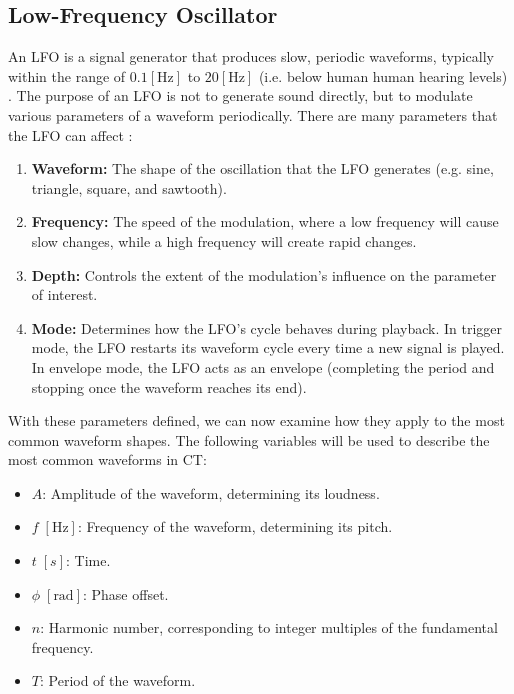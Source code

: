 \documentclass[12pt]{article}
\begin{document}
\subsection{Low-Frequency Oscillator}
An LFO is a signal generator that produces slow, periodic waveforms, typically within the range of $0.1 [\text{Hz}]$ to $20 [\text{Hz}]$ (i.e. below human human hearing levels) \cite{MAMO}. The purpose of an LFO is not to generate sound directly, but to modulate various parameters of a waveform periodically. There are many parameters that the LFO can affect \cite{EDMPROD}:
\begin{enumerate}
    \item \textbf{Waveform:} The shape of the oscillation that the LFO generates (e.g. sine, triangle, square, and sawtooth).
    \item \textbf{Frequency:} The speed of the modulation, where a low frequency will cause slow changes, while a high frequency will create rapid changes. 
    \item \textbf{Depth:} Controls the extent of the modulation's influence on the parameter of interest.
    \item \textbf{Mode:} Determines how the LFO's cycle behaves during playback. In trigger mode, the LFO restarts its waveform cycle every time a new signal is played. In envelope mode, the LFO acts as an envelope (completing the period and stopping once the waveform reaches its end). 
\end{enumerate}

With these parameters defined, we can now examine how they apply to the most common waveform shapes. The following variables will be used to describe the most common waveforms in CT:
\begin{itemize}
    \item \( A \): Amplitude of the waveform, determining its loudness.
    \item \( f \; [\text{Hz}]\): Frequency of the waveform, determining its pitch. 
    \item \( t \; [s]\): Time.
    \item \( \phi \; [\text{rad}]\): Phase offset.
    \item \( n \): Harmonic number, corresponding to integer multiples of the fundamental frequency.
    \item \( T \): Period of the waveform.
\end{itemize}
\end{document}
